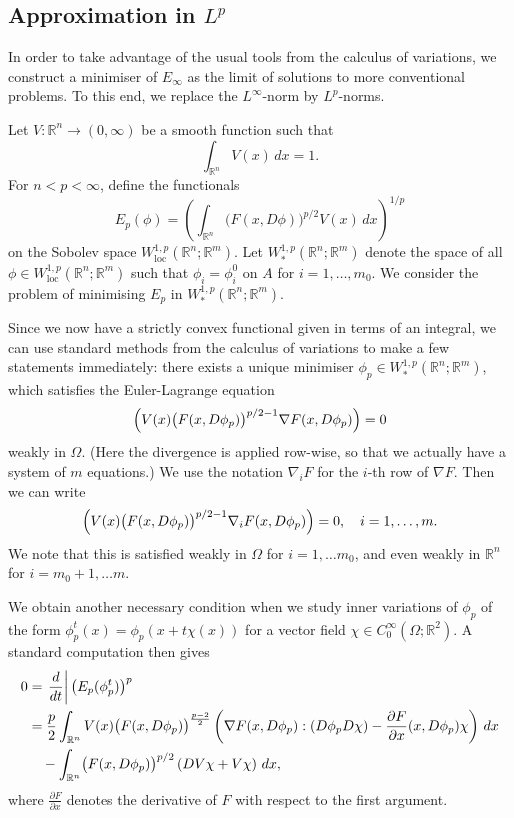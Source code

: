 \documentclass[a4paper]{article}
\newcommand{\R}{\mathbb{R}}
\newcommand{\loc}{\mathrm{loc}}
\newcommand{\grad}{\nabla}
\let\div\relax\DeclareMathOperator{\div}{div}
\newcommand{\dd}[2]{\frac{\partial #1}{\partial #2}}
\theoremstyle{definition}
\theoremstyle{remark}
\begin{document}
\subsection{Approximation in $L^p$}

In order to take advantage of the usual tools from the calculus of variations,
we construct a minimiser of $E_\infty$ as the limit of solutions to more conventional
problems. To this end, we replace the $L^\infty$-norm by $L^p$-norms.

Let $V \colon \R^n \to (0, \infty)$ be a smooth function such that
\[
\int_{\R^n} V(x) \, dx = 1.
\]
For $n < p < \infty$, define the functionals
\[
E_p(\phi) = \left(\int_{\R^n} \bigl(F(x, D\phi)\bigr)^{p/2} V(x) \, dx\right)^{1/p}
\]
on the Sobolev space $W_\loc^{1, p}(\R^n; \R^m)$. Let $W_*^{1, p}(\R^n; \R^m)$ denote the space of all
$\phi \in W_\loc^{1, p}(\R^n; \R^m)$ such that $\phi_i = \phi_i^0$ on $A$
for $i = 1, \dotsc, m_0$. We consider the problem of minimising
$E_p$ in $W_*^{1, p}(\R^n; \R^m)$.

Since we now have a strictly convex functional given in terms of an integral,
we can use standard methods from the calculus of variations to make a few
statements immediately: there exists a unique minimiser
$\phi_p \in W_*^{1, p}(\R^n; \R^m)$, which satisfies the Euler-Lagrange
equation
\[
\div\left(V(x) \bigl(F(x, D\phi_p)\bigr)^{p/2 - 1} \grad F(x, D\phi_p)\right) = 0
\]
weakly in $\Omega$.
(Here the divergence is applied row-wise, so that we actually have a system
of $m$ equations.) We use the notation $\grad_i F$ for the $i$-th row of $\grad F$.
Then we can write
\begin{equation} \label{eq:Euler-Lagrange0}
\div\left(V(x) \bigl(F(x, D\phi_p)\bigr)^{p/2 - 1} \grad_i F(x, D\phi_p)\right) = 0, \quad i = 1, \dotsc, m.
\end{equation}
We note that this is satisfied weakly in $\Omega$ for $i = 1, \dotsc m_0$,
and even weakly in $\R^n$ for $i = m_0 + 1, \dotsc m$.

We obtain another necessary condition when we study inner variations of
$\phi_p$ of the form $\phi_p^t(x) = \phi_p(x + t\chi(x))$ for a vector field
$\chi \in C_0^\infty(\Omega; \R^2)$. A standard computation then gives
\begin{equation} \label{eq:inner-variations0}
\begin{split}
0 & = \left.\frac{d}{dt}\right| \bigl(E_p(\phi_p^t)\bigr)^p \\
& = \frac{p}{2} \int_{\R^n} V(x) \bigl(F(x, D\phi_p)\bigr)^{\frac{p - 2}{2}} \left(\grad F(x, D\phi_p) : (D\phi_p D\chi) - \dd{F}{x}(x, D\phi_p) \chi\right) \, dx \\
& \quad - \int_{\R^n} \bigl(F(x, D\phi_p)\bigr)^{p/2} \left(DV \chi + V \div \chi\right) \, dx,
\end{split}
\end{equation}
where $\dd{F}{x}$ denotes the derivative of $F$ with respect to the first
argument.
\end{document}
